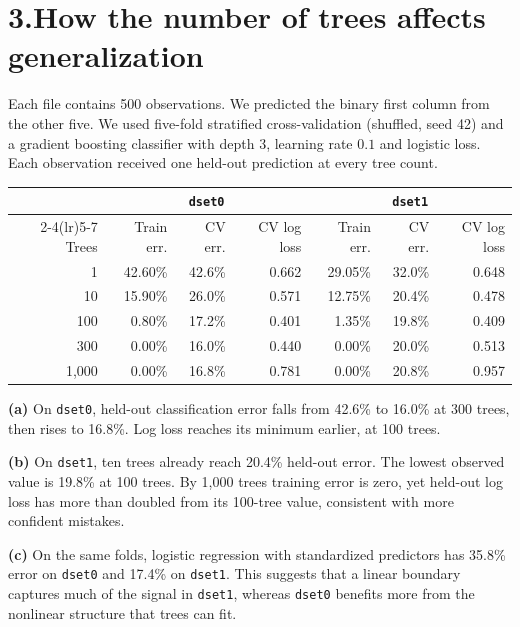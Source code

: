 \documentclass[11pt,letterpaper]{article}
\newcommand{\subpart}[1]{\textbf{(#1)}\enspace}
\begin{document}
\section*{3.\quad How the number of trees affects generalization}
Each file contains 500 observations. We predicted the binary first column from the other five.
We used five-fold stratified cross-validation (shuffled, seed 42) and a
gradient boosting classifier with depth 3, learning rate $0.1$ and logistic
loss. Each observation received one held-out prediction at every tree count.

\begin{center}
\begin{tabular}{r@{\hspace{1.3em}}rrr@{\hspace{1.5em}}rrr}
\toprule
& \multicolumn{3}{c}{\texttt{dset0}} & \multicolumn{3}{c}{\texttt{dset1}}\\
\cmidrule(lr){2-4}\cmidrule(lr){5-7}
Trees & Train err. & CV err. & CV log loss & Train err. & CV err. & CV log loss\\
\midrule
1     & 42.60\% & 42.6\% & 0.662 & 29.05\% & 32.0\% & 0.648\\
10    & 15.90\% & 26.0\% & 0.571 & 12.75\% & 20.4\% & 0.478\\
100   &  0.80\% & 17.2\% & 0.401 &  1.35\% & 19.8\% & 0.409\\
300   &  0.00\% & 16.0\% & 0.440 &  0.00\% & 20.0\% & 0.513\\
1,000 &  0.00\% & 16.8\% & 0.781 &  0.00\% & 20.8\% & 0.957\\
\bottomrule
\end{tabular}
\end{center}

\subpart{a} On \texttt{dset0}, held-out classification error falls from
42.6\% to 16.0\% at 300 trees, then rises to 16.8\%. Log loss reaches its
minimum earlier, at 100 trees.

\subpart{b} On \texttt{dset1}, ten trees already reach 20.4\% held-out
error. The lowest observed value is 19.8\% at 100 trees. By 1,000 trees
training error is zero, yet held-out log loss has more than doubled from
its 100-tree value, consistent with more confident mistakes.

\subpart{c} On the same folds, logistic regression with standardized predictors has 35.8\% error on
\texttt{dset0} and 17.4\% on \texttt{dset1}. This suggests that a linear
boundary captures much of the signal in \texttt{dset1}, whereas
\texttt{dset0} benefits more from the nonlinear structure that trees can fit.
\end{document}
